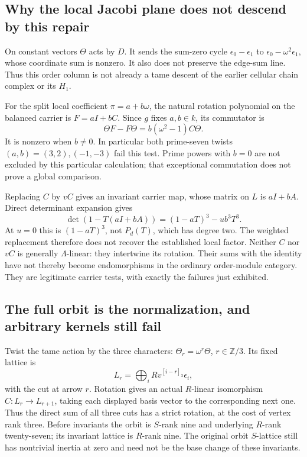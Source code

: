 \documentclass[11pt]{article}
\theoremstyle{definition}\newtheorem{definition}[theorem]{Definition}
\theoremstyle{remark}\newtheorem{remark}[theorem]{Remark}
\begin{document}
\subsection{Why the local Jacobi plane does not descend by this repair}
On constant vectors $\Theta$ acts by $D$. It sends the sum-zero cycle $\epsilon_0-\epsilon_1$ to $\epsilon_0-\omega^2\epsilon_1$, whose coordinate sum is nonzero. It also does not preserve the edge-sum line. Thus this order column is not already a tame descent of the earlier cellular chain complex or its $H_1$.

For the split local coefficient $\pi=a+b\omega$, the natural rotation polynomial on the balanced carrier is $F=aI+bC$. Since $g$ fixes $a,b\in k$, its commutator is
\[
 \Theta F-F\Theta=b(\omega^2-1)C\Theta.
\]
It is nonzero when $b\ne0$. In particular both prime-seven twists $(a,b)=(3,2),(-1,-3)$ fail this test. Prime powers with $b=0$ are not excluded by this particular calculation; that exceptional commutation does not prove a global comparison.

Replacing $C$ by $vC$ gives an invariant carrier map, whose matrix on $L$ is $aI+bA$. Direct determinant expansion gives
\[
 \det(1-T(aI+bA))=(1-aT)^3-ub^3T^3.
\]
At $u=0$ this is $(1-aT)^3$, not $P_d(T)$, which has degree two. The weighted replacement therefore does not recover the established local factor. Neither $C$ nor $vC$ is generally $\Lambda$-linear: they intertwine its rotation. Their sums with the identity have not thereby become endomorphisms in the ordinary order-module category. They are legitimate carrier tests, with exactly the failures just exhibited.

\subsection{The full orbit is the normalization, and arbitrary kernels still fail}
Twist the tame action by the three characters: $\Theta_r=\omega^r\Theta$, $r\in\mathbb Z/3$. Its fixed lattice is
\[
 L_r=\bigoplus_i Rv^{[i-r]_3}\epsilon_i,
\]
with the cut at arrow $r$. Rotation gives an actual $R$-linear isomorphism $C:L_r\to L_{r+1}$, taking each displayed basis vector to the corresponding next one. Thus the direct sum of all three cuts has a strict rotation, at the cost of vertex rank three. Before invariants the orbit is $S$-rank nine and underlying $R$-rank twenty-seven; its invariant lattice is $R$-rank nine. The original orbit $S$-lattice still has nontrivial inertia at zero and need not be the base change of these invariants.
\end{document}
